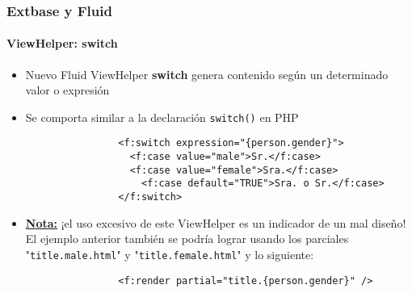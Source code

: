 \begin{frame}[fragile]
	\frametitle{Extbase y Fluid}
	\framesubtitle{ViewHelper: switch}

	\lstset{
		basicstyle=\smaller\ttfamily
	}

	\begin{itemize}
		\item Nuevo Fluid ViewHelper \textbf{switch} genera contenido según un determinado valor o expresión
		\item Se comporta similar a la declaración \texttt{switch()} en PHP

			\begin{lstlisting}
				<f:switch expression="{person.gender}">
				  <f:case value="male">Sr.</f:case>
				  <f:case value="female">Sra.</f:case>
					<f:case default="TRUE">Sra. o Sr.</f:case>
				</f:switch>
			\end{lstlisting}

		\item \textbf{\underline{Nota:}} ¡el uso excesivo de este ViewHelper es un indicador de un mal diseño! El ejemplo anterior también se podría lograr usando los parciales "\texttt{title.male.html}" y "\texttt{title.female.html}" y lo siguiente:

			\begin{lstlisting}
				<f:render partial="title.{person.gender}" />
			\end{lstlisting}

	\end{itemize}

\end{frame}


